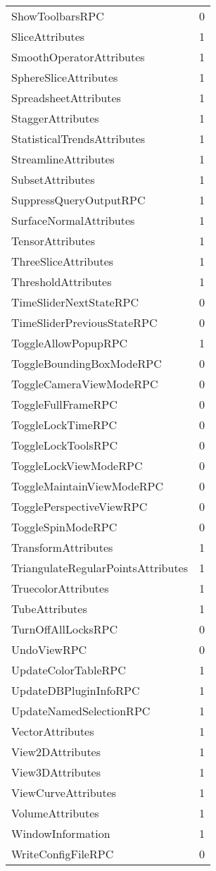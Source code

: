 \documentclass[10pt,a4paper]{report}
\begin{document}
\begin{longtable}{ll}
ShowToolbarsRPC & 0 \\
SliceAttributes & 1 \\
SmoothOperatorAttributes & 1 \\
SphereSliceAttributes & 1 \\
SpreadsheetAttributes & 1 \\
StaggerAttributes & 1 \\
StatisticalTrendsAttributes & 1 \\
StreamlineAttributes & 1 \\
SubsetAttributes & 1 \\
SuppressQueryOutputRPC & 1 \\
SurfaceNormalAttributes & 1 \\
TensorAttributes & 1 \\
ThreeSliceAttributes & 1 \\
ThresholdAttributes & 1 \\
TimeSliderNextStateRPC & 0 \\
TimeSliderPreviousStateRPC & 0 \\
ToggleAllowPopupRPC & 1 \\
ToggleBoundingBoxModeRPC & 0 \\
ToggleCameraViewModeRPC & 0 \\
ToggleFullFrameRPC & 0 \\
ToggleLockTimeRPC & 0 \\
ToggleLockToolsRPC & 0 \\
ToggleLockViewModeRPC & 0 \\
ToggleMaintainViewModeRPC & 0 \\
TogglePerspectiveViewRPC & 0 \\
ToggleSpinModeRPC & 0 \\
TransformAttributes & 1 \\
TriangulateRegularPointsAttributes & 1 \\
TruecolorAttributes & 1 \\
TubeAttributes & 1 \\
TurnOffAllLocksRPC & 0 \\
UndoViewRPC & 0 \\
UpdateColorTableRPC & 1 \\
UpdateDBPluginInfoRPC & 1 \\
UpdateNamedSelectionRPC & 1 \\
VectorAttributes & 1 \\
View2DAttributes & 1 \\
View3DAttributes & 1 \\
ViewCurveAttributes & 1 \\
VolumeAttributes & 1 \\
WindowInformation & 1 \\
WriteConfigFileRPC & 0 \\
\end{longtable}

\end{document}
